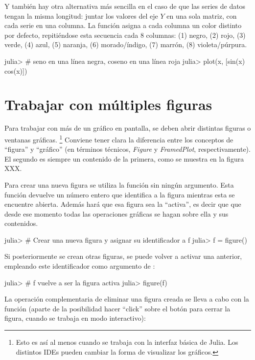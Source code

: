 Y también hay otra alternativa más sencilla en el caso de que las series de datos tengan la misma longitud: juntar los valores del eje $Y$ en una sola matriz, con cada serie en una columna. La función  asigna a cada columna un color distinto por defecto, repitiéndose esta secuencia cada 8 columnas: (1) negro, (2) rojo, (3) verde, (4) azul, (5) naranja, (6) morado/índigo, (7) marrón, (8) violeta/púrpura.

\begin{jlconcode}
julia> # seno en una línea negra, coseno en una línea roja
julia> plot(x, [sin(x) cos(x)])
\end{jlconcode}

\section{Trabajar con múltiples figuras}

Para trabajar con más de un gráfico en pantalla, se deben abrir distintas figuras o ventanas gráficas.%
\footnote{%
Esto es así al menos cuando se trabaja con la interfaz básica de Julia. Los distintos IDEs pueden cambiar la forma de visualizar los gráficos.%
}
Conviene tener clara la diferencia entre los conceptos de ``figura'' y ``gráfico'' (en términos técnicos, \emph{Figure} y \emph{FramedPlot}, respectivamente). El segundo es siempre un contenido de la primera, como se muestra en la figura XXX.

Para crear una nueva figura se utiliza la función  sin ningún argumento. Esta función devuelve un número entero que identifica a la figura mientras esta se encuentre abierta. Además hará que esa figura sea la ``activa'', es decir que que desde ese momento todas las operaciones gráficas se hagan sobre ella y sus contenidos.

\begin{jlconcode}
julia> # Crear una nueva figura y asignar su identificador a f
julia> f = figure()
\end{jlconcode}

Si posteriormente se crean otras figuras, se puede volver a activar una anterior, empleando este identificador como argumento de :

\begin{jlconcode}
julia> # f vuelve a ser la figura activa
julia> figure(f)
\end{jlconcode}

La operación complementaria de eliminar una figura creada se lleva a cabo con la función  (aparte de la posibilidad hacer ``click'' sobre el botón para cerrar la figura, cuando se trabaja en modo interactivo):

